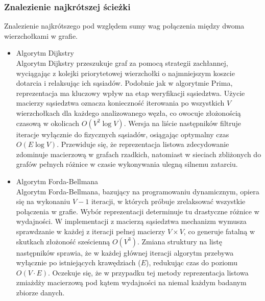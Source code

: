 \documentclass{article}
\theoremstyle{mytheoremstyle}
\theoremstyle{mytheoremstyle}
\theoremstyle{myproblemstyle}
\begin{document}
    \subsubsection{Znalezienie najkrótszej ścieżki}
      Znalezienie najkrótszego pod względem sumy wag połączenia między dwoma wierzchołkami w grafie.
      \begin{itemize}
        \item{Algorytm Dijkstry}\\
Algorytm Dijkstry przeszukuje graf za pomocą strategii zachłannej, wyciągając z kolejki priorytetowej wierzchołki o najmniejszym koszcie dotarcia i relaksując ich sąsiadów. Podobnie jak w algorytmie Prima, reprezentacja ma kluczowy wpływ na etap weryfikacji sąsiedztwa. Użycie macierzy sąsiedztwa oznacza konieczność iterowania po wszystkich $V$ wierzchołkach dla każdego analizowanego węzła, co owocuje złożonością czasową w okolicach $O(V^2 \log V)$. Wersja na liście następników filtruje iteracje wyłącznie do fizycznych sąsiadów, osiągając optymalny czas $O(E \log V)$. Przewiduje się, że reprezentacja listowa zdecydowanie zdominuje macierzową w grafach rzadkich, natomiast w sieciach zbliżonych do grafów pełnych różnice w czasie wykonywania ulegną silnemu zatarciu.
\cite{Dijkstra}
        \item{Algorytm Forda-Bellmana}\\
Algorytm Forda-Bellmana, bazujący na programowaniu dynamicznym, opiera się na wykonaniu $V-1$ iteracji, w których próbuje zrelaksować wszystkie połączenia w grafie. Wybór reprezentacji determinuje tu drastyczne różnice w wydajności. W implementacji z macierzą sąsiedztwa mechanizm wymusza sprawdzanie w każdej z iteracji pełnej macierzy $V \times V$, co generuje fatalną w skutkach złożoność sześcienną $O(V^3)$. Zmiana struktury na listę następników sprawia, że w każdej głównej iteracji algorytm przebywa wyłącznie po istniejących krawędziach ($E$), redukując czas do poziomu $O(V \cdot E)$. Oczekuje się, że w przypadku tej metody reprezentacja listowa zmiażdży macierzową pod kątem wydajności na niemal każdym badanym zbiorze danych.
\cite{Ford-Bellman}
      \end{itemize}
\end{document}
